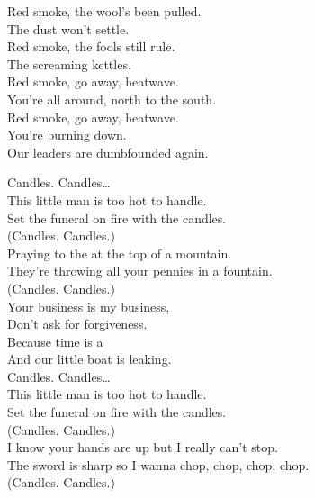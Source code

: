 Red smoke, the wool's been pulled. \\
The dust won't settle. \\
Red smoke, the fools still rule. \\
The screaming kettles. \\

Red smoke, go away, heatwave. \\
You're all around, north to the south. \\
Red smoke, go away, heatwave. \\
You're burning down. \\
Our leaders are dumbfounded again. \\





Candles. Candles… \\

This little man is too hot to handle. \\
Set the funeral on fire with the candles. \\
(Candles. Candles.) \\

Praying to the  at the top of a mountain. \\
They're throwing all your pennies in a fountain. \\
(Candles. Candles.) \\

Your business is my business, \\
Don't ask for forgiveness. \\
Because time is a  \\
And our little boat is leaking. \\

Candles. Candles… \\

This little man is too hot to handle. \\
Set the funeral on fire with the candles. \\
(Candles. Candles.) \\

I know your hands are up but I really can't stop. \\
The sword is sharp so I wanna chop, chop, chop, chop. \\
(Candles. Candles.) \\

